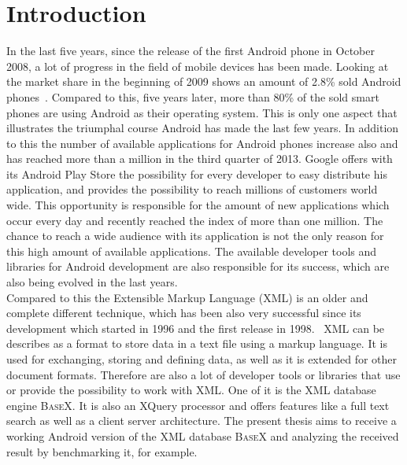 \chapter{Introduction}
\label{cha:introduction}
In the last five years, since the release of the first Android phone in October 2008, a lot of progress in the field of mobile devices has been made.
Looking at the market share in the beginning of 2009 shows an amount of 2.8\% sold Android phones~\cite{gandhewar2010google}.
Compared to this, five years later, more than 80\% of the sold smart phones are using Android as their operating system.
This is only one aspect that illustrates the triumphal course Android has made the last few years.
In addition to this the number of available applications for Android phones increase also and has reached more than a million in the third quarter of 2013.
Google offers with its Android Play Store the possibility for every developer to easy distribute his application, and provides the possibility to reach millions of customers world wide.
This opportunity is responsible for the amount of new applications which occur every day and recently reached the index of more than one million.
The chance to reach a wide audience with its application is not the only reason for this high amount of available applications.
The available developer tools and libraries for Android development are also responsible for its success, which are also being evolved in the last years.\\
Compared to this the Extensible Markup Language (XML) is an older and complete different technique, which has been also very successful since its development which started in 1996 and the first release in 1998.~\cite{bray1998extensible}
XML can be describes as a format to store data in a text file using a markup language.
It is used for exchanging, storing and defining data, as well as it is extended for other document formats.
Therefore are also a lot of developer tools or libraries that use or provide the possibility to work with XML.
One of it is the XML database engine \textsc{BaseX}.
It is also an XQuery processor and offers features like a full text search as well as a client server architecture.
The present thesis aims to receive a working Android version of the XML database \textsc{BaseX} and analyzing the received result by benchmarking it, for example.


